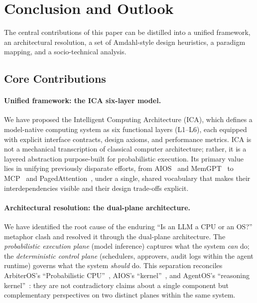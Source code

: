 \section{Conclusion and Outlook}
\label{sec:conclusion}

The central contributions of this paper can be distilled into a unified framework, an architectural resolution, a set of Amdahl-style design heuristics, a paradigm mapping, and a socio-technical analysis.

\subsection{Core Contributions}

\paragraph{Unified framework: the ICA six-layer model.}
We have proposed the Intelligent Computing Architecture (ICA), which defines a model-native computing system as six functional layers (L1--L6), each equipped with explicit interface contracts, design axioms, and performance metrics. ICA is not a mechanical transcription of classical computer architecture; rather, it is a layered abstraction purpose-built for probabilistic execution. Its primary value lies in unifying previously disparate efforts, from AIOS~\cite{mei2024aios} and MemGPT~\cite{memgpt2023} to MCP~\cite{mcp_intro_2026} and PagedAttention~\cite{kwon2023pagedattention}, under a single, shared vocabulary that makes their interdependencies visible and their design trade-offs explicit.

\paragraph{Architectural resolution: the dual-plane architecture.}
We have identified the root cause of the enduring ``Is an LLM a CPU or an OS?'' metaphor clash and resolved it through the dual-plane architecture. The \textit{probabilistic execution plane} (model inference) captures what the system \emph{can} do; the \textit{deterministic control plane} (schedulers, approvers, audit logs within the agent runtime) governs what the system \emph{should} do. This separation reconciles ArbiterOS's ``Probabilistic CPU''~\cite{arbiteros2025}, AIOS's ``kernel''~\cite{mei2024aios}, and AgentOS's ``reasoning kernel''~\cite{agentos2025}: they are not contradictory claims about a single component but complementary perspectives on two distinct planes within the same system.

